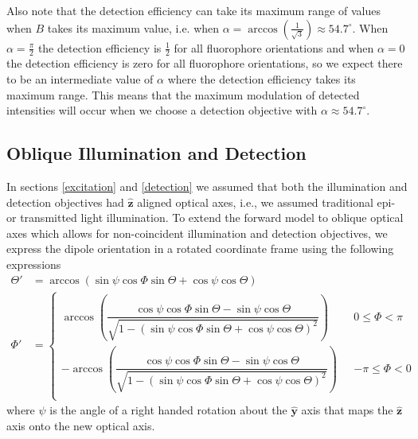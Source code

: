 \documentclass[10pt]{article}
\providecommand{\mh}[1]{\mathbf{\hat{#1}}}
\begin{document}
Also note that the detection efficiency can take its maximum range of values
when $B$ takes its maximum value, i.e. when
$\alpha=\arccos\left(\frac{1}{\sqrt{3}}\right) \approx 54.7^{\circ}$. When
$\alpha = \frac{\pi}{2}$ the detection efficiency is $\frac{1}{2}$ for all
fluorophore orientations and when $\alpha = 0$ the detection efficiency is zero
for all fluorophore orientations, so we expect there to be an intermediate value
of $\alpha$ where the detection efficiency takes its maximum range. This means
that the maximum modulation of detected intensities will occur when we choose a
detection objective with $\alpha \approx 54.7^{\circ}$.

\subsection{Oblique Illumination and Detection}\label{oblique}
In sections \ref{excitation} and \ref{detection} we assumed that both the
illumination and detection objectives had $\mh{z}$ aligned optical axes, i.e.,
we assumed traditional epi- or transmitted light illumination. To extend the
forward model to oblique optical axes which allows for non-coincident
illumination and detection objectives, we express the dipole orientation in a
rotated coordinate frame using the following expressions
\begin{align}
    \Theta' &= \arccos\left(\sin\psi\cos\Phi\sin\Theta + \cos\psi\cos\Theta\right)\label{eq:thetap}\\
  \Phi' &=
          \begin{cases}
            \arccos\left(\dfrac{\cos\psi\cos\Phi\sin\Theta - \sin\psi\cos\Theta}{\sqrt{1 - (\sin\psi\cos\Phi\sin\Theta + \cos\psi\cos\Theta)^2}}\right) \ \ \ &0 \leq \Phi < \pi  \\
            -\arccos\left(\dfrac{\cos\psi\cos\Phi\sin\Theta - \sin\psi\cos\Theta}{\sqrt{1 - (\sin\psi\cos\Phi\sin\Theta + \cos\psi\cos\Theta)^2}}\right) \ \ \ &-\pi \leq \Phi < 0\\
          \end{cases}\label{eq:phip}
\end{align}
where $\psi$ is the angle of a right handed rotation about the $\mh{y}$ axis
that maps the $\mh{z}$ axis onto the new optical axis.
\end{document}
